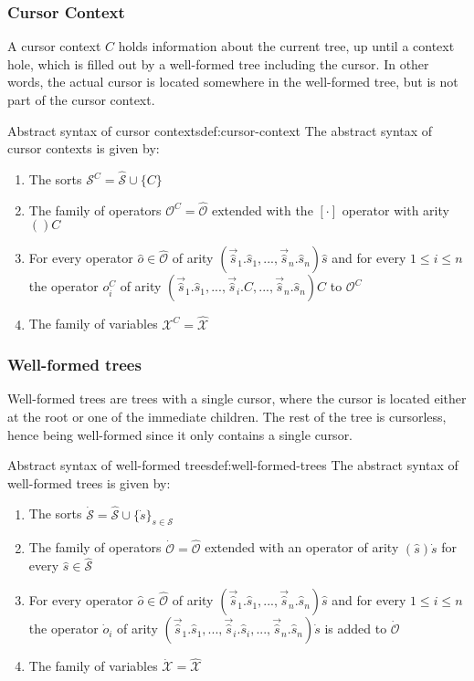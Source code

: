 \subsubsection{Cursor Context}
\label{subsubsec:cursor-context}
A cursor context $C$ holds information about the current tree, up until
a context hole, which is filled out by a well-formed tree including the cursor. 
In other words, the actual cursor is located somewhere in the well-formed tree, 
but is not part of the cursor context.

\begin{definition}{Abstract syntax of cursor contexts}{def:cursor-context}
The abstract syntax of cursor contexts is given by:
\begin{enumerate}
    \item The sorts $\mathcal{S}^C = \hat{\mathcal{S}} \cup \{C\}$
    \item The family of operators $\mathcal{O}^C = \hat{\mathcal{O}}$ extended with the $[\cdot]$ operator with arity $()C$
    \item For every operator $\hat{o} \in \hat{\mathcal{O}}$ of arity $(\vec{\hat{s}}_1.\hat{s}_1,...,\vec{\hat{s}}_n.\hat{s}_n)\hat{s}$ and for every $1 \leq i \leq n$ the operator $o_i^C$ of arity $(\vec{\hat{s}}_1.\hat{s}_1,...,\vec{\hat{s}}_i.C,...,\vec{\hat{s}}_n.\hat{s}_n)C$ to $\mathcal{O}^C$
    \item The family of variables $\mathcal{X}^C = \hat{\mathcal{X}}$
\end{enumerate}
\end{definition}

\subsubsection{Well-formed trees}
\label{subsubsec:well-formed-trees}
Well-formed trees are trees with a single cursor, where the cursor is located either
at the root or one of the immediate children. The rest of the tree is cursorless,
hence being well-formed since it only contains a single cursor.

\begin{definition}{Abstract syntax of well-formed trees}{def:well-formed-trees}
The abstract syntax of well-formed trees is given by:
\begin{enumerate}
    \item The sorts $\dot{\mathcal{S}} = \hat{\mathcal{S}} \cup \{ \dot{s} \}_{s \in \mathcal{S}}$
    \item The family of operators $\dot{\mathcal{O}} = \hat{\mathcal{O}}$ extended with an operator of arity $(\hat{s})\dot{s}$ for every $\hat{s} \in \hat{\mathcal{S}}$
    \item For every operator $\hat{o} \in \hat{\mathcal{O}}$ of arity $(\vec{\hat{s}}_1.\hat{s}_1,...,\vec{\hat{s}}_n.\hat{s}_n)\hat{s}$ and for every $1 \leq i \leq n$ the operator $\dot{o}_i$ of arity $(\vec{\hat{s}}_1.\hat{s}_1,...,\vec{\hat{s}}_i.\hat{s}_i,...,\vec{\hat{s}}_n.\hat{s}_n)\dot{s}$ is added to $\dot{\mathcal{O}}$
    \item The family of variables $\dot{\mathcal{X}} = \hat{\mathcal{X}}$
\end{enumerate}
\end{definition}


